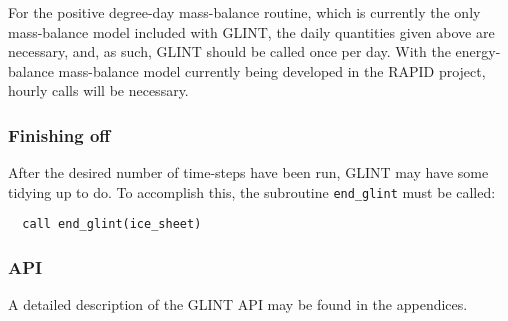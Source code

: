 %
For the positive degree-day mass-balance routine, which is currently the only
mass-balance model included with GLINT, the daily quantities given above are
necessary, and, as such, GLINT should be called once per day. With the
energy-balance mass-balance model currently being developed in the RAPID
project, hourly calls will be necessary. 
%
\subsubsection{Finishing off}
%
After the desired number of time-steps have been run, GLINT may have some
tidying up to do. To accomplish this, the subroutine \texttt{end\_glint}
must be called:
%
\begin{verbatim}
  call end_glint(ice_sheet)
\end{verbatim}
%
\subsubsection{API}
%
A detailed description of the GLINT API may be found in the appendices.
%
